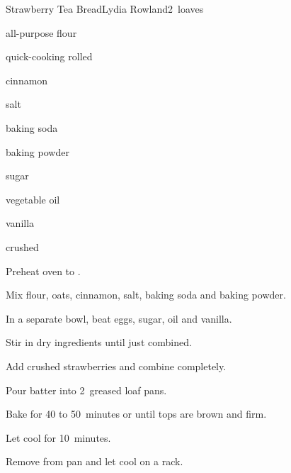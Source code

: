 \begin{recipe}{Strawberry Tea Bread}{Lydia Rowland}{2~loaves}

\begin{ingredients}
\item {} all-purpose flour
\item \C{1\half} quick-cooking rolled 
\item {} cinnamon
\item {} salt
\item {} baking soda
\item \tp{\half} baking powder
\item {} sugar
\item {} vegetable oil
\item {} vanilla
\item {} crushed 
\end{ingredients}

\begin{directions}
\item Preheat oven to .
\item Mix flour, oats, cinnamon, salt, baking soda and baking powder.
\item In a separate bowl, beat eggs, sugar, oil and vanilla.
\item Stir in dry ingredients until just combined.
\item Add crushed strawberries and combine completely.
\item Pour batter into 2~greased loaf pans.
\item Bake for 40 to 50~minutes or until tops are brown and firm.
\item Let cool for 10~minutes.
\item Remove from pan and let cool on a rack.
\end{directions}

\end{recipe}
